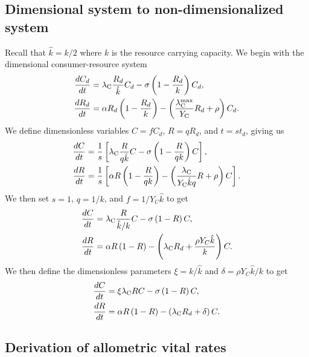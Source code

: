 \documentclass[]{rsos}%
\begin{document}
\renewcommand{\thepage}{S\arabic{page}}
\renewcommand{\thesection}{S\arabic{section}}
\renewcommand{\thetable}{S\arabic{table}}
\renewcommand{\thefigure}{S\arabic{figure}}
\renewcommand{\figurename}{Figure}
\setcounter{figure}{0}


\subsection{Dimensional system to non-dimensionalized system}

Recall that $\hat{k} = k/2$ where $k$ is the resource carrying capacity.
We begin with the dimensional consumer-resource system
\begin{align}
    \frac{dC_d}{dt} &= \lambda_{\rm C}\frac{R_d}{\hat{k}}C_d- \sigma \left(1 - \frac{R_d}{k} \right)C_d, \nonumber \\ 
    \frac{dR_d}{dt} &= \alpha R_d \left(1 - \frac{R_d}{k} \right) - \left(\frac{\lambda^{\rm max}_{\rm C}}{Y_{\rm C}}R_d + \rho \right)C_d.
    \label{eq:2dDD1}
\end{align}
We define dimensionless variables $C = fC_d$, $R = qR_d$, and $t = st_d$, giving us
\begin{align}
    \frac{dC}{dt} &= \frac{1}{s}\left[\lambda_{\rm C}\frac{R}{q\hat{k}}C- \sigma \left(1 - \frac{R}{qk} \right)C\right], \nonumber \\ 
    \frac{dR}{dt} &= \frac{1}{s}\left[\alpha R \left(1 - \frac{R}{qk} \right) - \left(\frac{\lambda_{\rm C}}{Y_{\rm C}\hat{k}q}R + \rho \right)C\right].
    \label{eq:2dDD2}
\end{align}
We then set $s=1$, $q = 1/k$, and $f = 1/Y_C\hat{k}$ to get
\begin{align}
    \frac{dC}{dt} &= \lambda_{\rm C}\frac{R}{\hat{k}/k}C- \sigma \left(1 - R \right)C, \nonumber \\ 
    \frac{dR}{dt} &= \alpha R \left(1 - R \right) - \left(\lambda_{\rm C}R_d + \frac{\rho Y_C \hat{k}}{k} \right)C.
    \label{eq:2dDD3}
\end{align}
We then define the dimensionless parameters $\xi = k/\hat{k}$ and $\delta = \rho Y_C \hat{k}/k$ to get 
\begin{align}
    \frac{dC}{dt} &= \xi \lambda_{\rm C}R C- \sigma \left(1 - R \right)C, \nonumber \\ 
    \frac{dR}{dt} &= \alpha R \left(1 - R \right) - \left(\lambda_{\rm C}R_d + \delta \right)C.
    \label{eq:2dDD4}
\end{align}

\subsection{Derivation of allometric vital rates}
\end{document}
